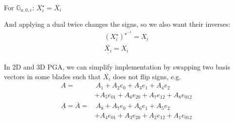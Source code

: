 \documentclass[twoside]{article}
\newcommand{\aside}[1]{\begin{flushright}\scriptsize{#1}\end{flushright}}
\begin{document}
\begin{multicols*}{2}
                \aside{For $ \mathbb{G}_{a,0,c} $: $ X_i^\star = \overline{X_i} $}
            \par
                And applying a dual twice changes the signs,
                so we also want their inverses:
                \begin{gather*}
                    (X_i^\star)^{\star^{-1}} = X_i \\
                    \underline{\overline{X_i}} = X_i
                \end{gather*}
            \par
                In 2D and 3D PGA, we can simplify implementation
                by swapping two basis vectors in some blades such that
                $ \overline{X_i} $ does not flip signs, e.g.
                $$\begin{aligned}
                    A = & \, A_1 + A_2 e_0 + A_3 e_1 + A_4 e_2 \\
                    &+ A_5 e_{01} + A_6 e_{20} + A_7 e_{12} + A_8 e_{012} \\
                    \underline{A} = \overline{A} =  & \, A_8 + A_7 e_0 + A_6 e_1 + A_5 e_2 \\
                    &+ A_4 e_{01} + A_3 e_{20} + A_2 e_{12} + A_1 e_{012} \\
                \end{aligned}$$

\end{multicols*}
\end{document}
